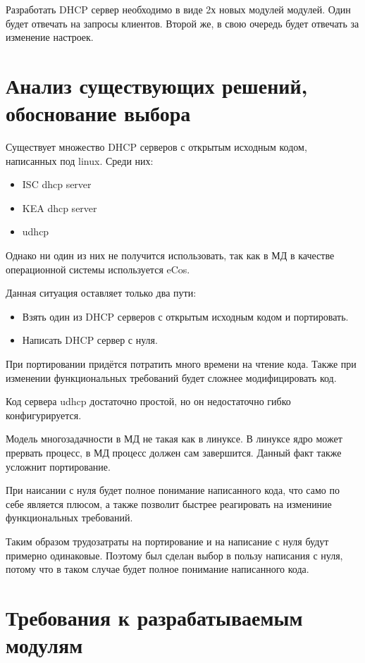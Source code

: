 \documentclass[14pt,a4paper]{extarticle}
\begin{document}
Разработать DHCP сервер необходимо в виде 2х новых модулей модулей.
Один будет отвечать на запросы клиентов.
Второй же, в свою очередь будет отвечать за изменение настроек.

\pagebreak
\section{Анализ существующих решений, обоснование выбора}

Существует множество DHCP серверов с открытым исходным кодом, написанных под linux. Среди них:
\begin{itemize}
    \item ISC dhcp server
    \item KEA dhcp server
    \item udhcp
\end{itemize}

Однако ни один из них не получится использовать, так как в МД в качестве операционной системы используется eCos.

Данная ситуация оставляет только два пути:

\begin{itemize}
    \item Взять один из DHCP серверов с открытым исходным кодом и портировать.
    \item Написать DHCP сервер с нуля.
\end{itemize}

При портировании придётся потратить много времени на чтение кода.
Также при изменении функциональных требований будет сложнее модифицировать код.

Код сервера udhcp достаточно простой, но он недостаточно гибко конфигурируется.

Модель многозадачности в МД не такая как в линуксе.
В линуксе ядро может прервать процесс, в МД процесс должен сам завершится.
Данный факт также усложнит портирование.

При наисании с нуля будет полное понимание написанного кода, что само по себе является плюсом, а также позволит быстрее реагировать на измениние функциональных требований.

Таким образом трудозатраты на портирование и на написание с нуля будут примерно одинаковые.
Поэтому был сделан выбор в пользу написания с нуля, потому что в таком случае будет полное понимание написанного кода.

\pagebreak
\section{Требования к разрабатываемым модулям}
\end{document}
